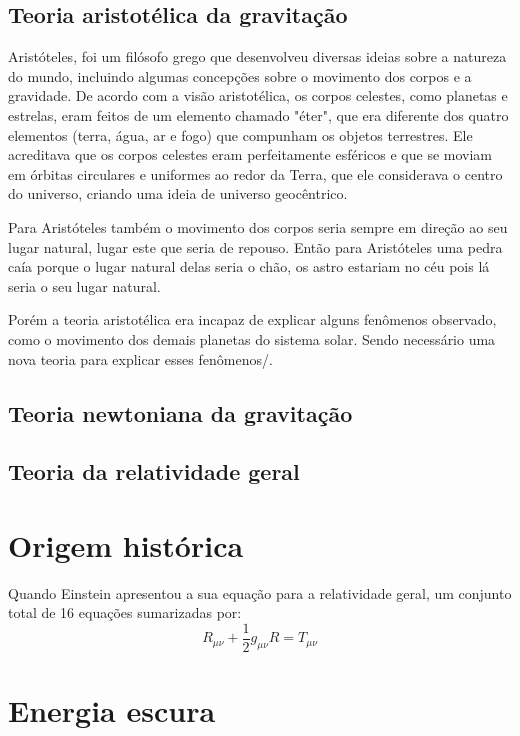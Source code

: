 \documentclass[
	article,			%
	11pt,				%
	twoside,			%
	a4paper,			%
	english,			%
	brazil,				%
	sumario=tradicional
	]{abntex2}
\begin{document}
\subsection{Teoria aristotélica da gravitação}



Aristóteles, foi um filósofo grego que desenvolveu diversas ideias sobre a natureza do mundo, incluindo algumas concepções sobre o movimento dos corpos e a gravidade. De acordo com a visão aristotélica, os corpos celestes, como planetas e estrelas, eram feitos de um elemento chamado "éter", que era diferente dos quatro elementos (terra, água, ar e fogo) que compunham os objetos terrestres. Ele acreditava que os corpos celestes eram perfeitamente esféricos e que se moviam em órbitas circulares e uniformes ao redor da Terra, que ele considerava o centro do universo, criando uma ideia de universo geocêntrico.

Para Aristóteles também o movimento dos corpos seria sempre em direção ao seu lugar natural, lugar este que seria de repouso. Então para Aristóteles uma pedra caía porque o lugar natural delas seria o chão, os astro estariam no céu pois lá seria o seu lugar natural.

Porém a teoria aristotélica era incapaz de explicar alguns fenômenos observado, como o movimento dos demais planetas do sistema solar. Sendo necessário uma nova teoria para explicar esses fenômenos/.

\subsection{Teoria newtoniana da gravitação}

\subsection{Teoria da relatividade geral}


\section{Origem histórica}
Quando Einstein apresentou a sua equação para a relatividade geral, um conjunto total de 16 equações sumarizadas por:
\begin{equation}
	R_{\mu \nu}+\frac{1}{2}g_{\mu \nu} R = T_{\mu \nu}
\end{equation}
\section{Energia escura}
\end{document}
